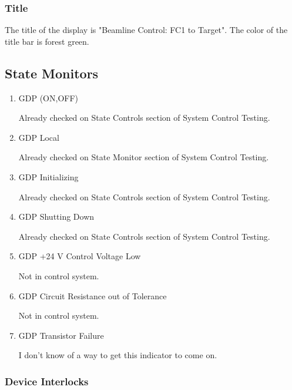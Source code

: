 \documentclass[11pt]{book}		%
\begin{document}
\subsubsection{Title}\label{sect:cyc-op-interface-status-terminal-display-contents-beamline-target-title}

The title of the display is "Beamline Control: FC1 to Target".  The color of the title bar is forest green.

\subsection{State Monitors}

\begin{enumerate}
 \item GDP (ON,OFF)

\color{red}
Already checked on State Controls section of System Control Testing.
\color{black}

 \item GDP Local

\color{red}
Already checked on State Monitor section of System Control Testing.
\color{black}

 \item GDP Initializing

\color{red}
Already checked on State Controls section of System Control Testing.
\color{black}

 \item GDP Shutting Down

\color{red}
Already checked on State Controls section of System Control Testing.
\color{black}

 \item GDP +24 V Control Voltage Low

\color{red}
Not in control system.
\color{black}

 \item GDP Circuit Resistance out of Tolerance

\color{red}
Not in control system.
\color{black}

\item GDP Transistor Failure

\color{red}
I don't know of a way to get this indicator to come on.
\color{black}

\end{enumerate}

\subsubsection{Device Interlocks}
\end{document}

